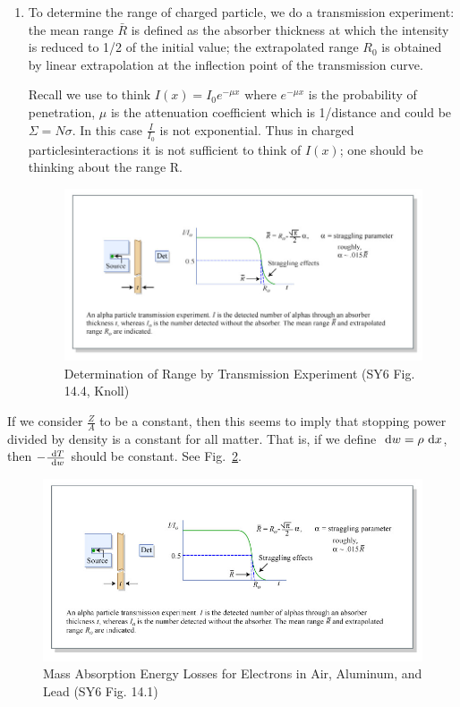 \documentclass{school-22.101-notes}
\begin{document}
\begin{enumerate}
\item To determine the range of charged particle, we do a transmission experiment: the mean range $\bar{R}$ is defined as the absorber thickness at which the intensity is reduced to 1/2 of the initial value; the extrapolated range $R_0$ is obtained by linear extrapolation at the inflection point of the transmission curve. 

Recall we use to think $\displaystyle I(x) = I_0 e^{-\mu x}$ where $e^{-\mu x}$ is the probability of penetration, $\mu$ is the attenuation coefficient which is 1/distance and could be $\Sigma = N \sigma$. In this case $\frac{I}{I_0}$ is not exponential. Thus in charged particlesinteractions it is not sufficient to think of $I(x)$; one should be thinking about the range R. 
\begin{figure}[h]
  \centering
  \includegraphics[width=5in]{images/ni/14.4.png}
  \caption{Determination of Range by Transmission Experiment (SY6 Fig. 14.4, Knoll)} \label{14.4}
\end{figure}
\end{enumerate}



If we consider $\frac{Z}{A}$ to be a constant, then this seems to imply that stopping power divided by density is a constant for all matter. That is, if we define $\mbox{ }\mathrm{d} w = \rho \mbox{ }\mathrm{d} x$, then $-\frac{\mbox{ }\mathrm{d} T}{\mbox{ }\mathrm{d} w}$ should be constant. See Fig.~\ref{14.1}. 
\begin{figure}[ht]
  \centering
  \includegraphics[width=5in]{images/ni/14.4.png}
  \caption{Mass Absorption Energy Losses for Electrons in Air, Aluminum, and Lead (SY6 Fig. 14.1)} \label{14.1}
\end{figure}
\end{document}

